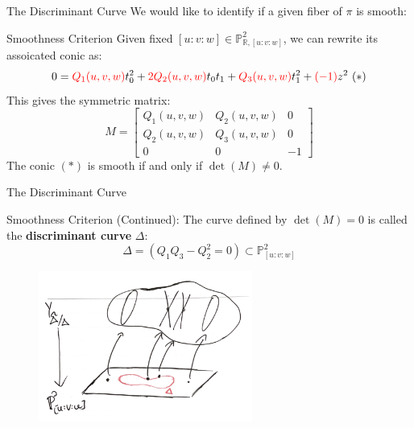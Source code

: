 \documentclass[hyperref, notheorems]{beamer}
\newcommand{\Rbb}{\mathbb{R}}
\newcommand{\Pbb}{\mathbb{P}}
\theoremstyle{definition}
\begin{document}
\begin{frame}{The Discriminant Curve}
We would like to identify if a given fiber of $\pi$ is smooth:
    \begin{block}{Smoothness Criterion}
       Given fixed $[u: v: w] \in \Pbb^2_{\Rbb, [u: v: w]}$, we can rewrite its assoicated conic as:
       \[0 = {\color{red}Q_1(u, v, w)}t_0^2 + {\color{red}2Q_2(u, v, w)}t_0t_1 + {\color{red}Q_3(u, v, w)}t_1^2 + {\color{red}(-1)}z^2\ (*)\]
       This gives the symmetric matrix:
       \[M = \begin{bmatrix}
       Q_1(u, v, w) & Q_2(u, v, w) & 0\\
       Q_2(u, v, w) & Q_3(u, v, w) & 0\\
       0 & 0 & -1
       \end{bmatrix}\]
       The conic $(*)$ is smooth if and only if $\det(M) \neq 0$.
    \end{block}
\end{frame}

\begin{frame}{The Discriminant Curve}
    \begin{block}{Smoothness Criterion (Continued):}
    The curve defined by $\det(M) = 0$ is called the \textbf{discriminant curve} $\Delta$:
    \[\Delta = (Q_1Q_3 - Q_2^2 = 0) \subset \Pbb^2_{[u: v: w]}\]
    \end{block}

\begin{figure}[h]
    \includegraphics[width=7cm]{graphics/conic_bundle.png}
\end{figure}
\end{frame}
\end{document}
